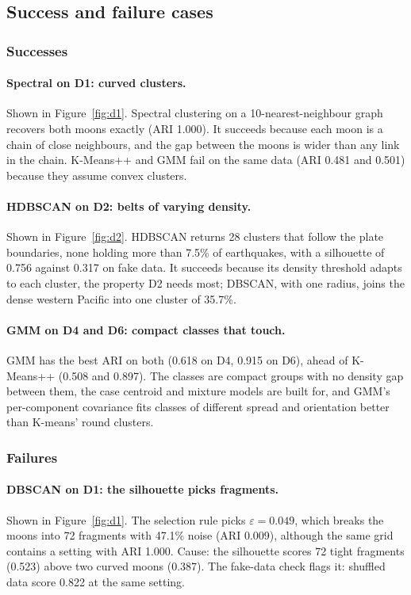 \subsection{Success and failure cases}\label{sec:cases}


\subsubsection{Successes}
\paragraph{Spectral on D1: curved clusters.} Shown in Figure~\ref{fig:d1}. Spectral clustering on a
10-nearest-neighbour graph recovers both moons exactly (ARI 1.000). It succeeds because each moon is a
chain of close neighbours, and the gap between the moons is wider than any link in the chain. K-Means++
and GMM fail on the same data (ARI 0.481 and 0.501) because they assume convex clusters.
\paragraph{HDBSCAN on D2: belts of varying density.} Shown in Figure~\ref{fig:d2}. HDBSCAN returns 28
clusters that follow the plate boundaries, none holding more than 7.5\% of earthquakes, with a silhouette
of 0.756 against 0.317 on fake data. It succeeds because its density threshold adapts to each cluster,
the property D2 needs most; DBSCAN, with one radius, joins the dense western Pacific into one cluster of
35.7\%.
\paragraph{GMM on D4 and D6: compact classes that touch.} GMM has the best ARI on both (0.618 on D4,
0.915 on D6), ahead of K-Means++ (0.508 and 0.897). The classes are compact groups with no density gap
between them, the case centroid and mixture models are built for, and GMM's per-component covariance fits
classes of different spread and orientation better than K-means' round clusters.

\subsubsection{Failures}
\paragraph{DBSCAN on D1: the silhouette picks fragments.} Shown in Figure~\ref{fig:d1}. The selection
rule picks $\varepsilon=0.049$, which breaks the moons into 72 fragments with 47.1\% noise (ARI 0.009),
although the same grid contains a setting with ARI 1.000. Cause: the silhouette scores 72 tight fragments
(0.523) above two curved moons (0.387). The fake-data check flags it: shuffled data score 0.822 at the
same setting.

